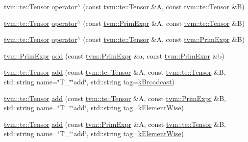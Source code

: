 \begin{DoxyCompactItemize}
\item 
\hyperlink{classtvm_1_1te_1_1Tensor}{tvm\+::te\+::\+Tensor} \hyperlink{namespacetopi_a9b0a7209ba4948e2a93a0f4ef8cfff96}{operator$^\wedge$} (const \hyperlink{classtvm_1_1te_1_1Tensor}{tvm\+::te\+::\+Tensor} \&A, const \hyperlink{classtvm_1_1te_1_1Tensor}{tvm\+::te\+::\+Tensor} \&B)
\item 
\hyperlink{classtvm_1_1te_1_1Tensor}{tvm\+::te\+::\+Tensor} \hyperlink{namespacetopi_a35bf01e8dc4855d30b28c0818d6bf441}{operator$^\wedge$} (const \hyperlink{classtvm_1_1PrimExpr}{tvm\+::\+Prim\+Expr} \&A, const \hyperlink{classtvm_1_1te_1_1Tensor}{tvm\+::te\+::\+Tensor} \&B)
\item 
\hyperlink{classtvm_1_1te_1_1Tensor}{tvm\+::te\+::\+Tensor} \hyperlink{namespacetopi_a24c2f0fcea7e4d0160bbc1460aacb0ac}{operator$^\wedge$} (const \hyperlink{classtvm_1_1te_1_1Tensor}{tvm\+::te\+::\+Tensor} \&A, const \hyperlink{classtvm_1_1PrimExpr}{tvm\+::\+Prim\+Expr} \&B)
\item 
\hyperlink{classtvm_1_1PrimExpr}{tvm\+::\+Prim\+Expr} \hyperlink{namespacetopi_aa894e21659f08e663915f88a16f64b2d}{add} (const \hyperlink{classtvm_1_1PrimExpr}{tvm\+::\+Prim\+Expr} \&a, const \hyperlink{classtvm_1_1PrimExpr}{tvm\+::\+Prim\+Expr} \&b)
\item 
\hyperlink{classtvm_1_1te_1_1Tensor}{tvm\+::te\+::\+Tensor} \hyperlink{namespacetopi_a0beda9e0b06f230d7a9e7af6f1954fde}{add} (const \hyperlink{classtvm_1_1te_1_1Tensor}{tvm\+::te\+::\+Tensor} \&A, const \hyperlink{classtvm_1_1te_1_1Tensor}{tvm\+::te\+::\+Tensor} \&B, std\+::string name=\char`\"{}T\+\_\+\char`\"{}\char`\"{}add\char`\"{}, std\+::string tag=\hyperlink{namespacetopi_a794b9155e9ba9d1c9c42a1cff1fb645f}{k\+Broadcast})
\item 
\hyperlink{classtvm_1_1te_1_1Tensor}{tvm\+::te\+::\+Tensor} \hyperlink{namespacetopi_ab5869dabbd57cf8dddd720a22f7c6ef0}{add} (const \hyperlink{classtvm_1_1te_1_1Tensor}{tvm\+::te\+::\+Tensor} \&A, const \hyperlink{classtvm_1_1PrimExpr}{tvm\+::\+Prim\+Expr} \&B, std\+::string name=\char`\"{}T\+\_\+\char`\"{}\char`\"{}add\char`\"{}, std\+::string tag=\hyperlink{namespacetopi_ac1b34ed59d38a5f5338bee6b2cad42be}{k\+Element\+Wise})
\item 
\hyperlink{classtvm_1_1te_1_1Tensor}{tvm\+::te\+::\+Tensor} \hyperlink{namespacetopi_ad0606e6f2b4fb7fa08ef1b3713b35ebc}{add} (const \hyperlink{classtvm_1_1PrimExpr}{tvm\+::\+Prim\+Expr} \&A, const \hyperlink{classtvm_1_1te_1_1Tensor}{tvm\+::te\+::\+Tensor} \&B, std\+::string name=\char`\"{}T\+\_\+\char`\"{}\char`\"{}add\char`\"{}, std\+::string tag=\hyperlink{namespacetopi_ac1b34ed59d38a5f5338bee6b2cad42be}{k\+Element\+Wise})

\end{DoxyCompactItemize}
